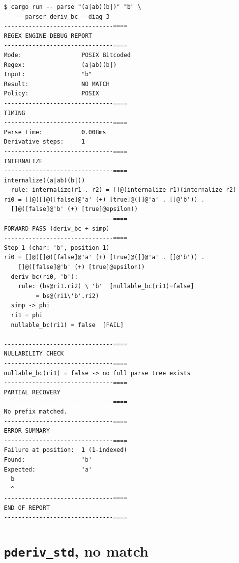 \begin{verbatim}
$ cargo run -- parse "(a|ab)(b|)" "b" \
    --parser deriv_bc --diag 3
-------------------------------====
REGEX ENGINE DEBUG REPORT
-------------------------------====
Mode:                 POSIX Bitcoded
Regex:                (a|ab)(b|)
Input:                "b"
Result:               NO MATCH
Policy:               POSIX
-------------------------------====
TIMING
-------------------------------====
Parse time:           0.008ms
Derivative steps:     1
-------------------------------====
INTERNALIZE
-------------------------------====
internalize((a|ab)(b|))
  rule: internalize(r1 . r2) = []@(internalize r1)(internalize r2)
ri0 = []@([]@([false]@'a' (+) [true]@([]@'a' . []@'b')) .
  []@([false]@'b' (+) [true]@epsilon))
-------------------------------====
FORWARD PASS (deriv_bc + simp)
-------------------------------====
Step 1 (char: 'b', position 1)
ri0 = []@([]@([false]@'a' (+) [true]@([]@'a' . []@'b')) .
    []@([false]@'b' (+) [true]@epsilon))
  deriv_bc(ri0, 'b'):
    rule: (bs@ri1.ri2) \ 'b'  [nullable_bc(ri1)=false]
         = bs@(ri1\'b'.ri2)
  simp -> phi
  ri1 = phi
  nullable_bc(ri1) = false  [FAIL]

-------------------------------====
NULLABILITY CHECK
-------------------------------====
nullable_bc(ri1) = false -> no full parse tree exists
-------------------------------====
PARTIAL RECOVERY
-------------------------------====
No prefix matched.
-------------------------------====
ERROR SUMMARY
-------------------------------====
Failure at position:  1 (1-indexed)
Found:                'b'
Expected:             'a'
  b
  ^
-------------------------------====
END OF REPORT
-------------------------------====
\end{verbatim}

\section{\texttt{pderiv\_std}, no match}
\label{app:report-pderiv-std-nomatch}

